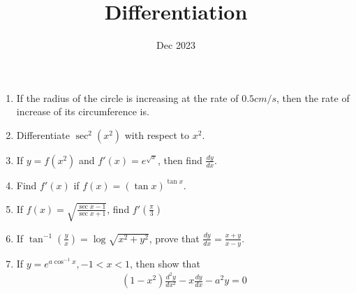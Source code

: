 \documentclass[12pt,-letter paper]{article}
\title{Differentiation}
\date{Dec 2023}
\providecommand{\brak}[1]{\ensuremath{\left(#1\right)}}
\begin{document}
\maketitle
\begin{enumerate}

\item If the radius of the circle is increasing at the rate of $0.5cm/s$, then the rate of increase of its circumference is.

\item Differentiate $\sec^2(x^2)$ with respect to $x^2$.

\item If $y=f(x^2)$ and $f'(x)=e^{\sqrt{x}}$, then find $\frac{dy}{dx}$.

\item Find $f'(x)$ if $f(x)=(\tan x)^{\tan x}$.

\item If $f(x)=\sqrt{\frac{\sec x -1}{\sec x + 1}}$, find $f'\brak{\frac{\pi}{3}}$

\item If $\tan^{-1}\brak{\frac{y}{x}}=\log\sqrt{x^2+y^2}$, prove that $\frac{dy}{dx}=\frac{x+y}{x-y}$.

\item If $y=e^{a \cos^{-1}x}, -1<x<1$, then show that
	\begin{align}	
		\brak{1-x^2}\frac{d^2y}{dx^2}-x\frac{dy}{dx}-a^2y=0
	\end{align}
\end{enumerate}
\end{document}
